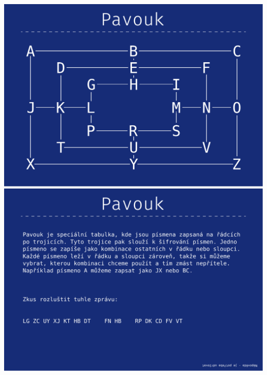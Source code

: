 \documentclass[a4paper]{article}
\begin{document}
	\pagebreak
	\noindent
	\includegraphics[width=\textwidth]{ciphers/pavouk_0.pdf}
	\includegraphics[width=\textwidth]{ciphers/pavouk_1.pdf}
	
	\pagebreak
	\noindent
\end{document}
